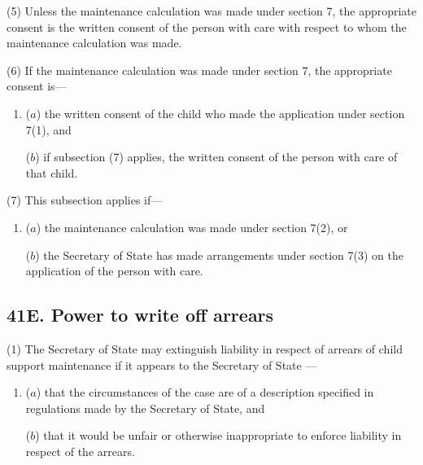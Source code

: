\documentclass[a4paper]{article}
\begin{document}
(5)
Unless the maintenance calculation was made under section 7, the appropriate consent is the written consent of the person with care with respect to whom the maintenance calculation was made.

(6)
If the maintenance calculation was made under section 7, the appropriate consent is---
\begin{enumerate}\item[]
($a$) the written consent of the child who made the application under section 7(1), and

($b$) if subsection (7) applies, the written consent of the person with care of that child.
\end{enumerate}

(7) This subsection applies if---
\begin{enumerate}\item[]
($a$) the maintenance calculation was made under section 7(2), or

($b$) the Secretary of State has made arrangements under section 7(3) on the application of the person with care.
\end{enumerate}


\subsection{41E. Power to write off arrears}

(1) The 
Secretary of State %
may extinguish liability in respect of arrears of child support maintenance if it appears to 
the Secretary of State%
---
\begin{enumerate}\item[]
($a$) that the circumstances of the case are of a description specified in regulations made by the Secretary of State, and

($b$) that it would be unfair or otherwise inappropriate to enforce liability in
respect of the arrears.
\end{enumerate}
\end{document}
